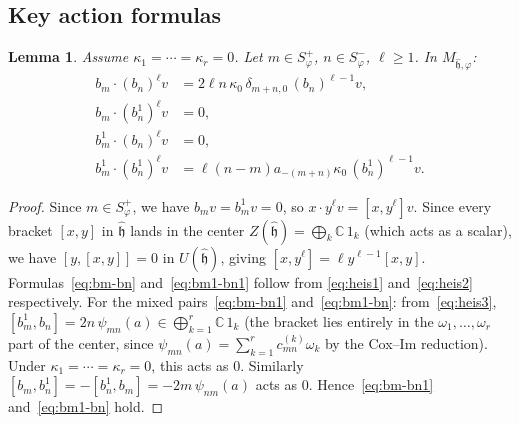 \documentclass{amsart}
\newcommand{\Cx}{\mathbb{C}}
\newcommand{\h}{\mathfrak{h}}
\newcommand{\wh}[1]{\widehat{#1}}
\newcommand{\whh}{\wh{\h}}
\newtheorem{lemma}[theorem]{Lemma}
\theoremstyle{definition}
\theoremstyle{remark}
\numberwithin{equation}{section}
\begin{document}
\subsection{Key action formulas}
\begin{lemma}\label{lem:key-action}
Assume $\kappa_1=\cdots=\kappa_r=0$.
Let $m\in S_\varphi^+$, $n\in S_\varphi^-$, $\ell\ge1$.  In
$M_{\whh,\varphi}$:
\begin{align}
b_m\cdot(b_n)^\ell v
  &=2\ell n\,\kappa_0\,\delta_{m+n,0}\,(b_n)^{\ell-1}v,\label{eq:bm-bn}\\
b_m\cdot(b_n^1)^\ell v
  &=0,\label{eq:bm-bn1}\\
b_m^1\cdot(b_n)^\ell v
  &=0,\label{eq:bm1-bn}\\
b_m^1\cdot(b_n^1)^\ell v
  &=\ell(n-m)a_{-(m+n)}\kappa_0\,(b_n^1)^{\ell-1}v.\label{eq:bm1-bn1}
\end{align}
\end{lemma}
\begin{proof}
Since $m\in S_\varphi^+$, we have $b_m v=b_m^1 v=0$, so
$x\cdot y^\ell v=[x,y^\ell]v$.  Since every bracket $[x,y]$ in $\whh$
lands in the center $Z(\whh)=\bigoplus_k\Cx\,1_k$ (which acts as a
scalar), we have $[y,[x,y]]=0$ in $U(\whh)$, giving
$[x,y^\ell]=\ell y^{\ell-1}[x,y]$.
Formulas~\eqref{eq:bm-bn} and~\eqref{eq:bm1-bn1} follow from
\eqref{eq:heis1} and~\eqref{eq:heis2} respectively.
For the mixed pairs~\eqref{eq:bm-bn1} and~\eqref{eq:bm1-bn}:
from~\eqref{eq:heis3}, $[b_m^1,b_n]=2n\,\psi_{mn}(a)\in
\bigoplus_{k=1}^r\Cx\,1_k$ (the bracket lies entirely in the
$\omega_1,\dots,\omega_r$ part of the center, since
$\psi_{mn}(a)=\sum_{k=1}^r c_{mn}^{(k)}\omega_k$ by the Cox--Im
reduction).  Under $\kappa_1=\cdots=\kappa_r=0$, this acts as $0$.
Similarly $[b_m,b_n^1]=-[b_n^1,b_m]=-2m\,\psi_{nm}(a)$ acts as $0$.
Hence~\eqref{eq:bm-bn1} and~\eqref{eq:bm1-bn} hold.
\end{proof}
\end{document}
